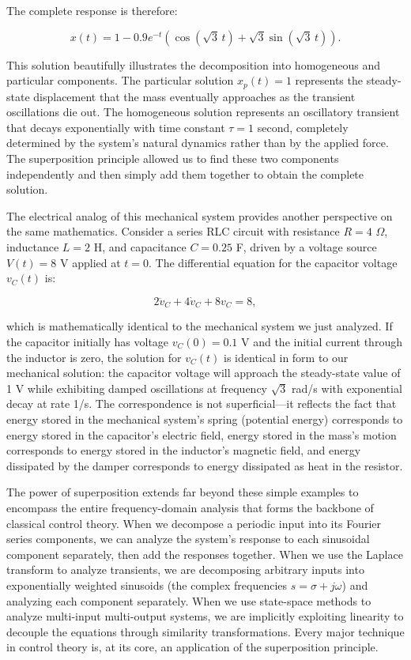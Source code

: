 The complete response is therefore:

\begin{equation}
x(t) = 1 - 0.9e^{-t}\left(\cos(\sqrt{3}\,t) + \sqrt{3}\sin(\sqrt{3}\,t)\right).
\end{equation}

This solution beautifully illustrates the decomposition into homogeneous and particular components. The particular solution $x_p(t) = 1$ represents the steady-state displacement that the mass eventually approaches as the transient oscillations die out. The homogeneous solution represents an oscillatory transient that decays exponentially with time constant $\tau = 1$ second, completely determined by the system's natural dynamics rather than by the applied force. The superposition principle allowed us to find these two components independently and then simply add them together to obtain the complete solution.

The electrical analog of this mechanical system provides another perspective on the same mathematics. Consider a series RLC circuit with resistance $R = 4$ $\Omega$, inductance $L = 2$ H, and capacitance $C = 0.25$ F, driven by a voltage source $V(t) = 8$ V applied at $t = 0$. The differential equation for the capacitor voltage $v_C(t)$ is:

\begin{equation}
2\ddot{v}_C + 4\dot{v}_C + 8v_C = 8,
\end{equation}

which is mathematically identical to the mechanical system we just analyzed. If the capacitor initially has voltage $v_C(0) = 0.1$ V and the initial current through the inductor is zero, the solution for $v_C(t)$ is identical in form to our mechanical solution: the capacitor voltage will approach the steady-state value of 1 V while exhibiting damped oscillations at frequency $\sqrt{3}$ rad/s with exponential decay at rate 1/s. The correspondence is not superficial—it reflects the fact that energy stored in the mechanical system's spring (potential energy) corresponds to energy stored in the capacitor's electric field, energy stored in the mass's motion corresponds to energy stored in the inductor's magnetic field, and energy dissipated by the damper corresponds to energy dissipated as heat in the resistor.

The power of superposition extends far beyond these simple examples to encompass the entire frequency-domain analysis that forms the backbone of classical control theory. When we decompose a periodic input into its Fourier series components, we can analyze the system's response to each sinusoidal component separately, then add the responses together. When we use the Laplace transform to analyze transients, we are decomposing arbitrary inputs into exponentially weighted sinusoids (the complex frequencies $s = \sigma + j\omega$) and analyzing each component separately. When we use state-space methods to analyze multi-input multi-output systems, we are implicitly exploiting linearity to decouple the equations through similarity transformations. Every major technique in control theory is, at its core, an application of the superposition principle.


